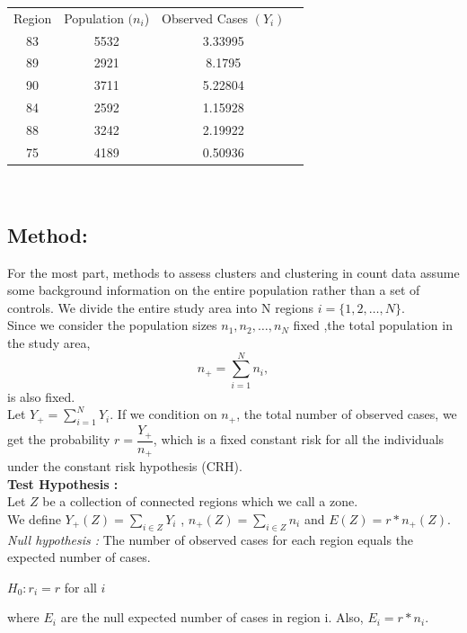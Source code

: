 \documentclass[12pt]{article}
\begin{document}
		\begin{tabular}{|c|c|c|c|}
		\hline
		Region & Population $(n_i$)& Observed Cases $(Y_i)$ & \\ 
		83 & 5532& 3.33995 & \\
		89 & 2921& 8.1795 & \\
		90 & 3711& 5.22804 & \\
		84 & 2592& 1.15928 & \\
		88 & 3242& 2.19922 & \\
		75 & 4189& 0.50936 & \\
		\hline
		\end{tabular}\\
			
			\subsection{Method:} 

			For the most part, methods to assess clusters and clustering in count data assume some background information on the entire population rather than a set of controls. 
			We divide the entire study area into N regions $ i = \{1,2,\dots,N\}$. \\
			Since we consider the population sizes $n_1,n_2,\dots,n_N$ fixed ,the total population in the study area, \\
\[
n_+ = \sum_{i =1}^{N}n_i,
\]
is also fixed. \\
Let $Y_+ = \sum_{i=1}^{N} Y_i$. If we condition on $n_+$, the total number of observed cases, we get the probability $ r = \dfrac{Y_+}{n_+}$, which is a fixed constant risk for all the individuals under the constant risk hypothesis (CRH).\\
		
			\textbf{Test Hypothesis :} \\ 
			Let $Z$ be a collection of connected regions which we call a zone. \\
			We define $Y_+(Z) = \sum_{i \in Z} Y_i$ , $n_+(Z)=\sum_{i \in Z} n_i$ and $E(Z) = r*n_+(Z)$. \\
			
			\textit{Null hypothesis :} The number of observed cases for each region equals the expected number of cases. \\ 
			\begin{center}
			$H_0 : r_i = r$ for all $i$
			 \end{center}
			 where $E_i$ are the null expected number of cases in region i. Also, $E_i = r * n_i$.\\
			
\end{document}
